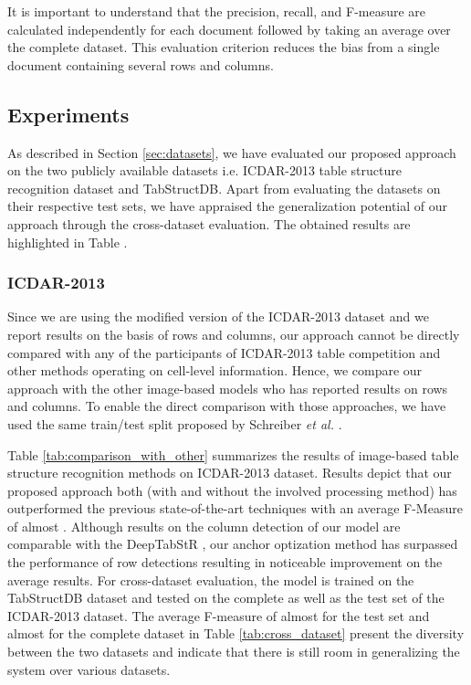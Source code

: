 \documentclass{ieeeaccess}
\begin{document}
It is important to understand that the precision, recall, and F-measure are calculated independently for each document followed by taking an average over the complete dataset. This evaluation criterion reduces the bias from a single document containing several rows and columns.


\subsection{Experiments}

As described in Section \ref{sec:datasets}, we have evaluated our proposed approach on the two publicly available datasets i.e. ICDAR-2013 table structure recognition dataset and TabStructDB. Apart from evaluating the datasets on their respective test sets, we have appraised the generalization potential of our approach through the cross-dataset evaluation. The obtained results are highlighted in Table .


\subsubsection{ICDAR-2013}
Since we are using the modified version of the ICDAR-2013 dataset and we report results on the basis of rows and columns, our approach cannot be directly compared with any of the participants of ICDAR-2013 table competition \cite{b18} and other methods operating on cell-level information.
Hence, we compare our approach with the other image-based models who has reported results on rows and columns. To enable the direct comparison with those approaches, we have used the same train/test split proposed by Schreiber \textit{et al.} \cite{b27}.  


Table \ref{tab:comparison_with_other} summarizes the results of image-based table structure recognition methods on ICDAR-2013 dataset. Results depict that our proposed approach both (with and without the involved processing method) has outperformed the previous state-of-the-art techniques with an average F-Measure of almost . Although results on the column detection of our model are comparable with the DeepTabStR \cite{b33}, our anchor optization method has surpassed the performance of row detections resulting in noticeable improvement on the average results. For cross-dataset evaluation, the model is trained on the TabStructDB dataset and tested on the complete as well as the test set of the ICDAR-2013 dataset. The average F-measure of almost  for the test set and almost  for the complete dataset in Table \ref{tab:cross_dataset} present the diversity between the two datasets and indicate that there is still room in generalizing the system over various datasets.
\end{document}

